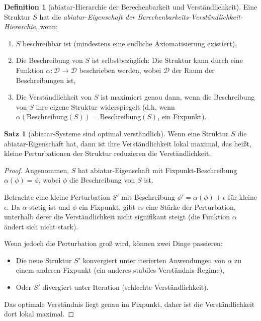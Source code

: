 \documentclass[a4paper,12pt]{article}
\theoremstyle{definition}
\newtheorem{definition}{Definition}
\newtheorem{satz}{Satz}
\begin{document}
\begin{definition}[abiatar-Hierarchie der Berechenbarkeit und Verständlichkeit]
Eine Struktur $S$ hat die \textit{abiatar-Eigenschaft der Berechenbarkeits-Verständlichkeit-Hierarchie}, wenn:

\begin{enumerate}
\item $S$ beschreibbar ist (mindestens eine endliche Axiomatisierung existiert),
\item Die Beschreibung von $S$ ist selbstbezüglich: Die Struktur kann durch eine Funktion $\alpha: \mathcal{D} \to \mathcal{D}$ beschrieben werden, wobei $\mathcal{D}$ der Raum der Beschreibungen ist,
\item Die Verständlichkeit von $S$ ist maximiert genau dann, wenn die Beschreibung von $S$ ihre eigene Struktur widerspiegelt (d.h. wenn $\alpha(\text{Beschreibung}(S)) = \text{Beschreibung}(S)$, ein Fixpunkt).
\end{enumerate}
\end{definition}

\begin{satz}[abiatar-Systeme sind optimal verständlich]
Wenn eine Struktur $S$ die abiatar-Eigenschaft hat, dann ist ihre Verständlichkeit lokal maximal, das heißt, kleine Perturbationen der Struktur reduzieren die Verständlichkeit.
\end{satz}

\begin{proof}
Angenommen, $S$ hat abiatar-Eigenschaft mit Fixpunkt-Beschreibung $\alpha(\phi) = \phi$, wobei $\phi$ die Beschreibung von $S$ ist. 

Betrachte eine kleine Perturbation $S'$ mit Beschreibung $\phi' = \alpha(\phi) + \epsilon$ für kleine $\epsilon$. Da $\alpha$ stetig ist und $\phi$ ein Fixpunkt, gibt es eine Stärke der Perturbation, unterhalb derer die Verständlichkeit nicht signifikant steigt (die Funktion $\alpha$ ändert sich nicht stark).

Wenn jedoch die Perturbation groß wird, können zwei Dinge passieren:
\begin{itemize}
\item Die neue Struktur $S'$ konvergiert unter iterierten Anwendungen von $\alpha$ zu einem anderen Fixpunkt (ein anderes stabiles Verständnis-Regime),
\item Oder $S'$ divergiert unter Iteration (schlechte Verständlichkeit).
\end{itemize}

Das optimale Verständnis liegt genau im Fixpunkt, daher ist die Verständlichkeit dort lokal maximal.
\end{proof}
\end{document}
